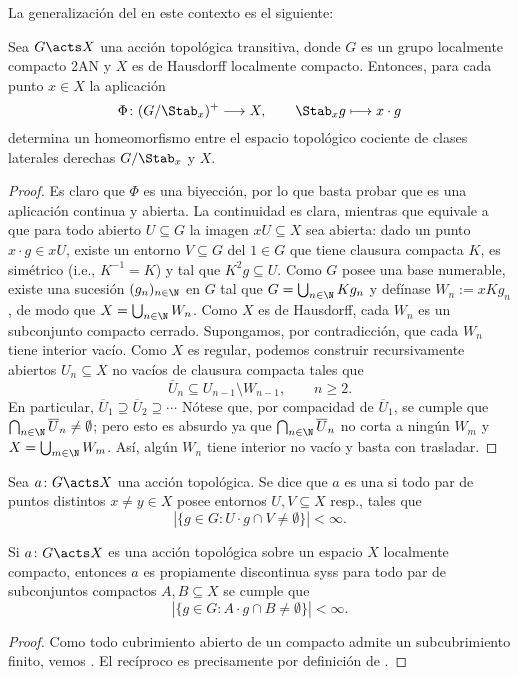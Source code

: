 \documentclass[teoria-numeros.tex]{subfiles}
\begin{document}
La generalización del  en este contexto es el siguiente:
\begin{thm}\label{thm:topological_orbit_stab}
	Sea $G \acts X$ una acción topológica transitiva, donde $G$ es un grupo localmente compacto 2AN y $X$ es de Hausdorff localmente compacto.
	Entonces, para cada punto $x \in X$ la aplicación
	$$ \Phi\colon (G/\Stab_x)^+ \longrightarrow X, \qquad \Stab_x g \longmapsto x\cdot g $$
	determina un homeomorfismo entre el espacio topológico cociente de clases laterales derechas $G / \Stab_x$ y $X$.
\end{thm}
\begin{proof}
	Es claro que $\Phi$ es una biyección, por lo que basta probar que es una aplicación continua y abierta.
	La continuidad es clara, mientras que  equivale a que para todo abierto $U \subseteq G$ la imagen $xU \subseteq X$ sea abierta:
	dado un punto $x\cdot g \in xU$, existe un entorno $V \subseteq G$ del $1 \in G$ que tiene clausura compacta $K$, es simétrico (i.e., $K^{-1} = K$)
	y tal que $K^2 g \subseteq U$.
	Como $G$ posee una base numerable, existe una sucesión $(g_n)_{n\in\N}$ en $G$ tal que $G = \bigcup_{n\in\N} Kg_n$ y defínase $W_n := xKg_n$,
	de modo que $X = \bigcup_{n\in\N} W_n$.
	Como $X$ es de Hausdorff, cada $W_n$ es un subconjunto compacto cerrado.
	Supongamos, por contradicción, que cada $W_n$ tiene interior vacío.
	Como $X$ es regular, podemos construir recursivamente abiertos $U_n \subseteq X$ no vacíos de clausura compacta tales que
	\[
		\overline{U}_n \subseteq U_{n-1} \setminus W_{n-1}, \qquad n \ge 2.
	\]
	En particular, $\overline{U}_1 \supseteq \overline{U}_2 \supseteq \cdots$
	Nótese que, por compacidad de $\overline{U}_1$, se cumple que $\bigcap_{n\in\N} \overline{U}_n \ne \emptyset$;
	pero esto es absurdo ya que $\bigcap_{n\in\N} \overline{U}_n$ no corta a ningún $W_m$ y $X = \bigcup_{m\in\N} W_m$.
	Así, algún $W_n$ tiene interior no vacío y basta con trasladar.
\end{proof}

\begin{mydef}
	Sea $a\colon G \acts X$ una acción topológica.
	Se dice que $a$ es una  si todo par de puntos distintos $x \ne y \in X$
	posee entornos $U, V \subseteq X$ resp., tales que
	\[
		|\{ g \in G : U\cdot g \cap V \ne \emptyset \}| < \infty.
	\]
\end{mydef}
\begin{cor}
	Si $a\colon G \acts X$ es una acción topológica sobre un espacio $X$ localmente compacto,
	entonces $a$ es propiamente discontinua syss para todo par de subconjuntos compactos $A, B \subseteq X$ se cumple que
	\[
		|\{ g \in G : A\cdot g \cap B \ne \emptyset \}| < \infty.
	\]
\end{cor}
\begin{proof}
	Como todo cubrimiento abierto de un compacto admite un subcubrimiento finito, vemos \textquote{${\implies}$}.
	El recíproco \textquote{$\impliedby$} es precisamente por definición de .
\end{proof}
\end{document}
